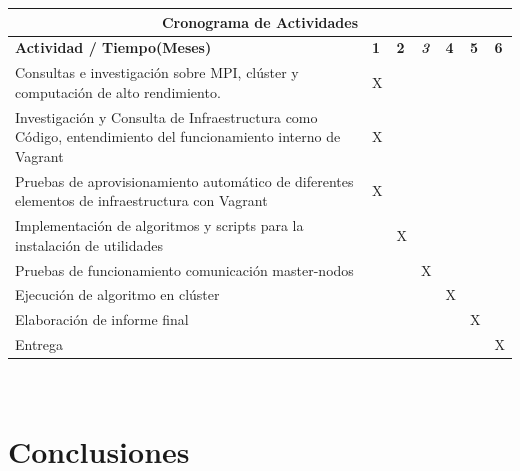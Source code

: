 \documentclass[letterpaper, 12pt, oneside]{article}
\begin{document}
    \begin{center}
    \begin{tabular}{|p{9.5cm}|p{0.4cm}|p{0.4cm}|p{0.4cm}|p{0.4cm}|p{0.4cm}|p{0.4cm}|}
    \hline
    \multicolumn{7}{|c|}{\textbf{Cronograma de Actividades}}\\
    \hline
    \textbf{Actividad / Tiempo(Meses)} & \textbf{1} & \textbf{2} & \textit{\textbf{3}} & \textbf{4} & \textbf{5} & \textbf{6} \\
    \hline
    Consultas e investigación sobre MPI, clúster y computación de alto rendimiento. & X &   &   &   &   &   \\
    \hline
    Investigación y Consulta de Infraestructura como Código, entendimiento del funcionamiento interno de Vagrant & X &   &   &   &   &   \\
    \hline
    Pruebas de aprovisionamiento automático de diferentes elementos de infraestructura con Vagrant & X &   &   &   &   &   \\
    \hline
    Implementación de algoritmos y scripts para la instalación de utilidades &  & X  &   &   &   &   \\
    \hline
    Pruebas de funcionamiento comunicación master-nodos &   &   & X &   &   &   \\
    \hline
    Ejecución de algoritmo en clúster &   &   &   & X &   &   \\
    \hline
    Elaboración de informe final &   &   &   &   & X &   \\
    \hline
    Entrega &   &   &   &   &   & X \\
    \hline
    \end{tabular}
    \end{center} \\
    
    \clearpage
    
    \section{Conclusiones}
    
\end{document}
